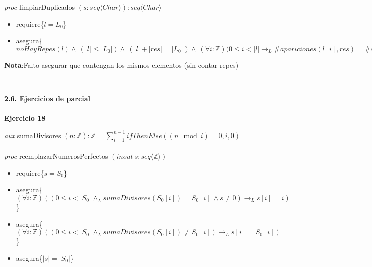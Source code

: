 \documentclass{article}
\begin{document}
{\begin{itemize}
{    \item[c) ] \textit{proc} limpiarDuplicados $(s:seq\langle Char\rangle):seq\langle Char\rangle$
    \begin{itemize}
        \item []requiere\{$l=L_0$\}
        \item []asegura\{$noHayRepes(l) \land\ (|l|\leq |L_0|) \land\ (|l|+|res|=|L_0|) \land\ (\forall i:\mathbb{Z})(0\leq i<|l| \to_L  \#apariciones(l[i],res)=\#apariciones(l[i],L_0)-1\}$
    \end{itemize}
    \textbf{Nota}:Falto asegurar que contengan los mismos elementos (sin contar repes)
    }\\
\end{itemize}
\noindent\huge{\textbf{2.6. Ejercicios de parcial}}\\\\
\LARGE{\textbf{Ejercicio 18}}\\
\begin{itemize}\large{
    \item [a) ] \textit{aux} sumaDivisores $(n:\mathbb{Z}):\mathbb{Z}=\displaystyle\sum_{i=1}^{n-1}ifThenElse((n \mod i) = 0, i,0)$\\\\
    \textit{proc} reemplazarNumerosPerfectos $(\textit{inout}\ s:seq\langle\mathbb{Z}\rangle)$
    \begin{itemize}
        \item []requiere\{$s=S_0$\}
        \item []asegura\{$(\forall i:\mathbb{Z})((0\leq i<|S_0| \land_L sumaDivisores(S_0[i])=S_0[i]\ \land s\neq 0)\to_L s[i]=i)$\}
        \item []asegura\{$(\forall i:\mathbb{Z})((0\leq i<|S_0| \land_L sumaDivisores(S_0[i])\neq S_0[i])\to_L s[i]=S_0[i])$\}
        \item []asegura\{$|s|=|S_0|$\} 
    \end{itemize}
    
}
\end{itemize}}
\end{document}
